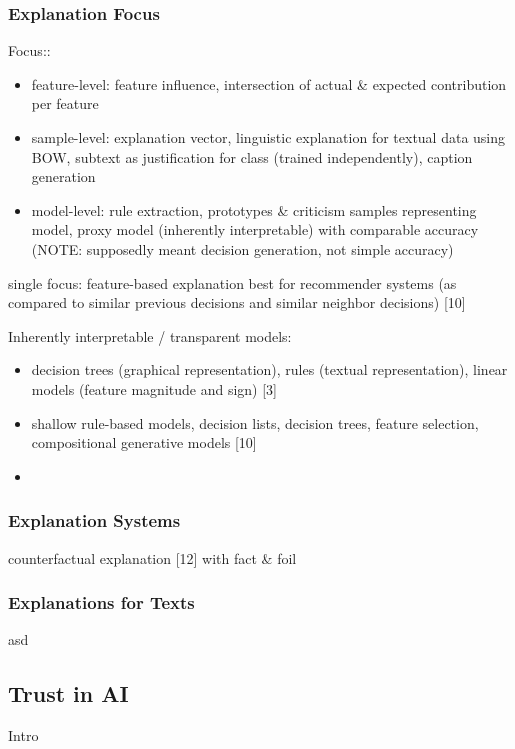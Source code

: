 \subsubsection{Explanation Focus}
Focus:\newline
[10]:
\begin{itemize}
	\item feature-level: feature influence, intersection of actual \& expected contribution per feature
	\item sample-level: explanation vector, linguistic explanation for textual data using BOW, subtext as justification for class (trained independently), caption generation 
	\item model-level: rule extraction, prototypes \& criticism samples representing model, proxy model (inherently interpretable) with comparable accuracy (NOTE: supposedly meant decision generation, not simple accuracy)
\end{itemize}
single focus: feature-based explanation best for recommender systems (as compared to similar previous decisions and similar neighbor decisions) [10] \newline

Inherently interpretable / transparent models:
\begin{itemize}
	\item decision trees (graphical representation), rules (textual representation), linear models (feature magnitude and sign) [3]
	\item shallow rule-based models, decision lists, decision trees, feature selection, compositional generative models [10]
	\item 
\end{itemize}




\subsubsection{Explanation Systems}
counterfactual explanation [12] with fact \& foil



\subsubsection{Explanations for Texts}
asd



\subsection{Trust in AI}
Intro


